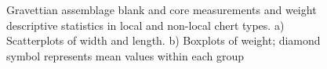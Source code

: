 \documentclass[
  a4paper,
  DIV=11,
  numbers=noendperiod]{scrreprt}
\begin{document}
\begin{figure}


\caption{\label{fig-gravettian-plots}Gravettian assemblage blank and
core measurements and weight descriptive statistics in local and
non-local chert types. a) Scatterplots of width and length. b) Boxplots
of weight; diamond symbol represents mean values within each group}

\end{figure}%
\end{document}
